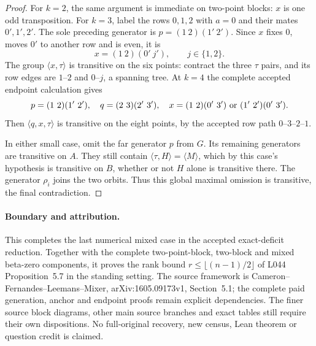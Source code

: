 \documentclass[11pt,a4paper]{article}
\newcommand{\gen}[1]{\langle#1\rangle}
\begin{document}
\begin{proof}
For $k=2$, the same argument is immediate on two-point
blocks: $x$ is one odd transposition. For $k=3$, label
the rows $0,1,2$ with $a=0$ and their mates $0',1',2'$.
The sole preceding generator is
$p=(1\ 2)(1'\ 2')$. Since $x$ fixes $0$, moves $0'$
to another row and is even, it is
\[
        x=(1\ 2)(0'\ j'),\qquad j\in\{1,2\}.
\]
The group $\gen{x,\tau}$ is transitive on the six points:
contract the three $\tau$ pairs, and its row edges are
$1$--$2$ and $0$--$j$, a spanning tree. At $k=4$ the
complete accepted endpoint calculation gives
\[
 p=(1\ 2)(1'\ 2'),\quad q=(2\ 3)(2'\ 3'),\quad
 x=(1\ 2)(0'\ 3')\ \hbox{or}\ (1'\ 2')(0'\ 3').
\]
Then $\gen{q,x,\tau}$ is transitive on the eight points,
by the accepted row path $0$--$3$--$2$--$1$.

In either small case, omit the far generator $p$ from
$G$. Its remaining generators are transitive on $A$.
They still contain $\gen{\tau,H}=\gen M$, which by this
case's hypothesis is transitive on $B$, whether or not
$H$ alone is transitive there. The generator $\rho_i$
joins the two orbits. Thus this global maximal omission
is transitive, the final contradiction.
\end{proof}

\paragraph{Boundary and attribution.}
This completes the last numerical mixed case in the accepted
exact-deficit reduction. Together with the complete two-point-block,
two-block and mixed beta-zero components, it proves the rank
bound $r\leq\lfloor(n-1)/2\rfloor$ of L044 Proposition~5.7
in the standing setting. The
source framework is Cameron--Fernandes--Leemans--Mixer,
arXiv:1605.09173v1, Section~5.1; the complete paid generation,
anchor and endpoint proofs remain explicit dependencies.
The finer source block diagrams, other main source branches
and exact tables still require their own dispositions.
No full-original recovery, new census, Lean theorem or
question credit is claimed.
\end{document}
